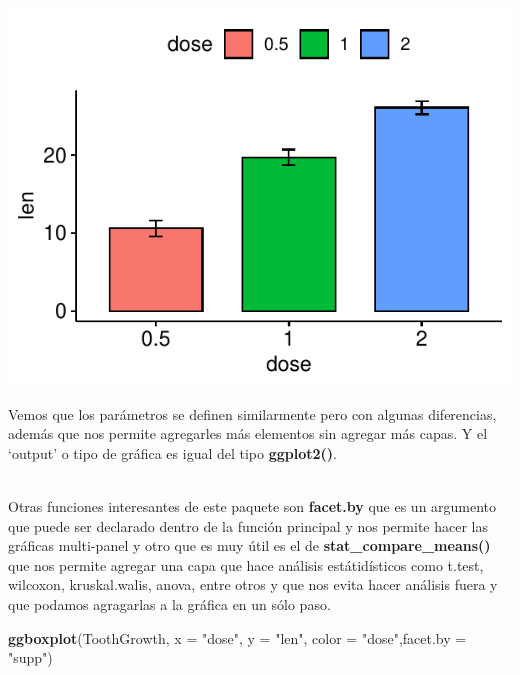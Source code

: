 \documentclass[
]{book}
\newenvironment{Shaded}{\begin{snugshade}}{\end{snugshade}}
\newcommand{\AttributeTok}[1]{\textcolor[rgb]{0.13,0.29,0.53}{#1}}
\newcommand{\FunctionTok}[1]{\textcolor[rgb]{0.13,0.29,0.53}{\textbf{#1}}}
\newcommand{\NormalTok}[1]{#1}
\newcommand{\StringTok}[1]{\textcolor[rgb]{0.31,0.60,0.02}{#1}}
\begin{document}
\begin{center}\includegraphics{R_Manual_files/figure-latex/unnamed-chunk-227-1} \end{center}

\hfill\break
Vemos que los parámetros se definen similarmente pero con algunas diferencias, además que nos permite agregarles más elementos sin agregar más capas.
Y el `output' o tipo de gráfica es igual del tipo \textbf{ggplot2()}.\\
\strut \\

Otras funciones interesantes de este paquete son \textbf{facet.by} que es un argumento que puede ser declarado dentro de la función principal y nos permite hacer las gráficas multi-panel y otro que es muy útil es el de \textbf{stat\_compare\_means()} que nos permite agregar una capa que hace análisis estátidísticos como t.test, wilcoxon, kruskal.walis, anova, entre otros y que nos evita hacer análisis fuera y que podamos agragarlas a la gráfica en un sólo paso.\\

\begin{Shaded}
\begin{Highlighting}[]
\FunctionTok{ggboxplot}\NormalTok{(ToothGrowth, }\AttributeTok{x =} \StringTok{"dose"}\NormalTok{, }\AttributeTok{y =} \StringTok{"len"}\NormalTok{, }\AttributeTok{color =} \StringTok{"dose"}\NormalTok{,}\AttributeTok{facet.by =} \StringTok{"supp"}\NormalTok{)}
\end{Highlighting}
\end{Shaded}
\end{document}
